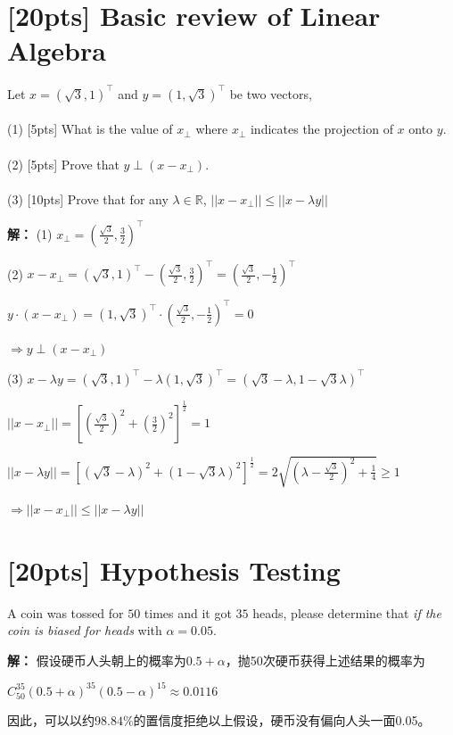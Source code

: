 \documentclass{article}
\begin{document}
	\section{[20pts] Basic review of Linear Algebra}
	Let $x = (\sqrt{3}, 1)^{\top}$ and $y = (1, \sqrt{3})^{\top}$ be two vectors,\\\\
	(1) [5pts] What is the value of $x_{\perp}$ where $x_{\perp}$ indicates the projection of $x$ onto $y$. \\\\
	(2) [5pts] Prove that $y \perp (x - x_{\perp})$.\\\\
	(3) [10pts] Prove that for any $\lambda \in \mathbb{R}$, $\lvert| x - x_{\perp}\rvert| \leq \lvert| x - \lambda y \rvert|$ 
	
	\begin{spacing}{2.0}
	\textbf{解：}
	(1)
	$x_{\perp}=(\frac{\sqrt{3}}{2},\frac{3}{2})^{\top}$

	(2)
	$x-x_{\perp}=(\sqrt{3}, 1)^{\top}-(\frac{\sqrt{3}}{2},\frac{3}{2})^{\top}
	=(\frac{\sqrt{3}}{2},-\frac{1}{2})^{\top}$

	$y\cdot (x-x_{\perp})
	=(1, \sqrt{3})^{\top}\cdot (\frac{\sqrt{3}}{2},-\frac{1}{2})^{\top}
	=0$

	$\Rightarrow y\perp (x - x_{\perp})$

	(3)
	$x-\lambda y=(\sqrt{3}, 1)^{\top}-\lambda(1, \sqrt{3})^{\top}
	=(\sqrt{3}-\lambda,1-\sqrt{3}\lambda)^{\top}$

	$\lvert| x - x_{\perp}|\rvert=[(\frac{\sqrt{3}}{2})^2+(\frac{3}{2})^2]^{\frac{1}{2}}
	=1$

	$\lvert|x-\lambda y|\rvert=[(\sqrt{3}-\lambda)^2+(1-\sqrt{3}\lambda)^2]^{\frac{1}{2}}
	=2\sqrt{(\lambda -\frac{\sqrt{3}}{2})^2+\frac{1}{4}}
	\geq 1$

	$\Rightarrow \lvert| x - x_{\perp}\rvert| \leq \lvert| x - \lambda y \rvert|$
	\end{spacing}





	\section{[20pts] Hypothesis Testing}
	A coin was tossed for $50$ times and it got $35$ heads, please determine that \emph{if the coin is biased for heads} with $\alpha = 0.05$.
	
	\begin{spacing}{2.0}
	\textbf{解：}
	假设硬币人头朝上的概率为$0.5+\alpha$，抛50次硬币获得上述结果的概率为

	$C_{50}^{35}(0.5+\alpha)^{35}(0.5-\alpha)^{15}\approx 0.0116$

	因此，可以以约$98.84\%$的置信度拒绝以上假设，硬币没有偏向人头一面0.05。
	\end{spacing}
\end{document}
